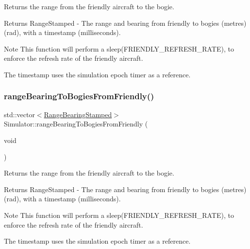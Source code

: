 Returns the range from the friendly aircraft to the bogie. 

\begin{DoxyReturn}{Returns}
Range\+Stamped -\/ The range and bearing from friendly to bogies (metres) (rad), with a timestamp (milliseconds). 
\end{DoxyReturn}
\begin{DoxyNote}{Note}
This function will perform a sleep(\+F\+R\+I\+E\+N\+D\+L\+Y\+\_\+\+R\+E\+F\+R\+E\+S\+H\+\_\+\+R\+A\+T\+E), to enforce the refresh rate of the friendly aircraft. 

The timestamp uses the simulation epoch timer as a reference. 
\end{DoxyNote}
\mbox{\label{classSimulator_af78c417dd541bf1f671894f49739106f}} 
\subsubsection{\texorpdfstring{range\+Bearing\+To\+Bogies\+From\+Friendly()}{rangeBearingToBogiesFromFriendly()}\hspace{0.1cm}{\footnotesize\ttfamily [2/2]}}
{\footnotesize\ttfamily std\+::vector$<$\hyperlink{structRangeBearingStamped}{Range\+Bearing\+Stamped}$>$ Simulator\+::range\+Bearing\+To\+Bogies\+From\+Friendly (\begin{DoxyParamCaption}\item[{void}]{ }\end{DoxyParamCaption})}



Returns the range from the friendly aircraft to the bogie. 

\begin{DoxyReturn}{Returns}
Range\+Stamped -\/ The range and bearing from friendly to bogies (metres) (rad), with a timestamp (milliseconds). 
\end{DoxyReturn}
\begin{DoxyNote}{Note}
This function will perform a sleep(\+F\+R\+I\+E\+N\+D\+L\+Y\+\_\+\+R\+E\+F\+R\+E\+S\+H\+\_\+\+R\+A\+T\+E), to enforce the refresh rate of the friendly aircraft. 

The timestamp uses the simulation epoch timer as a reference. 
\end{DoxyNote}
\mbox{\label{classSimulator_ae286a7571719440cc06b2441900efb44}} 
